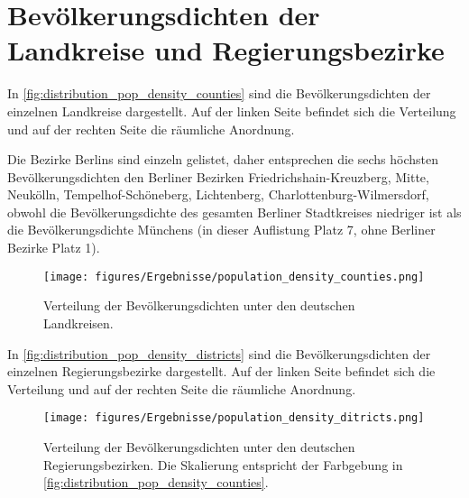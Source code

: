 \section{Bevölkerungsdichten der Landkreise und Regierungsbezirke}
In \autoref{fig:distribution_pop_density_counties} sind die Bevölkerungsdichten der einzelnen Landkreise dargestellt. Auf der linken Seite befindet sich die Verteilung und auf der rechten Seite die räumliche Anordnung.

Die Bezirke Berlins sind einzeln gelistet, daher entsprechen die sechs höchsten Bevölkerungsdichten den Berliner Bezirken  Friedrichshain-Kreuzberg, Mitte, Neukölln, Tempelhof-Schöneberg, Lichtenberg, Charlottenburg-Wilmersdorf, obwohl die Bevölkerungsdichte des gesamten Berliner Stadtkreises niedriger ist als die Bevölkerungsdichte Münchens (in dieser Auflistung Platz 7, ohne Berliner Bezirke Platz 1).

\begin{figure}[H]
    \centering
    \texttt{[image: figures/Ergebnisse/population\_density\_counties.png]}
    \caption{Verteilung der Bevölkerungsdichten unter den deutschen Landkreisen.}
    \label{fig:distribution_pop_density_counties}
\end{figure}


In \autoref{fig:distribution_pop_density_districts} sind die Bevölkerungsdichten der einzelnen Regierungsbezirke dargestellt. Auf der linken Seite befindet sich die Verteilung und auf der rechten Seite die räumliche Anordnung.

\begin{figure}[H]
    \centering
    \texttt{[image: figures/Ergebnisse/population\_density\_ditricts.png]}
    \caption{Verteilung der Bevölkerungsdichten unter den deutschen Regierungsbezirken. Die Skalierung entspricht der Farbgebung in \autoref{fig:distribution_pop_density_counties}.}
    \label{fig:distribution_pop_density_districts}
\end{figure}